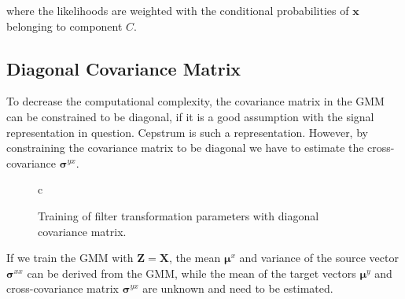 where the likelihoods are weighted with the conditional probabilities of $\mathbf{x}$ belonging to component $C$. 

\subsection{Diagonal Covariance Matrix} %
\label{sub:diagonal_covariance_matrix}
To decrease the computational complexity, the covariance matrix in the GMM can be constrained to be diagonal, if it is a good assumption with the signal representation in question. Cepstrum is such a representation. However, by constraining the covariance matrix to be diagonal we have to estimate the cross-covariance $\mathbf{\sigma}^{yx}$.

\begin{figure}[htbp]
	\centering
	\begin{tabular}[h]{c}
	\end{tabular}
	\caption{Training of filter transformation parameters with diagonal covariance matrix.}
	\label{fig:VC_training_diag}
\end{figure}

If we train the GMM with $\mathbf{Z}=\mathbf{X}$, the mean $\boldsymbol{\mu}^x$ and variance of the source vector $\boldsymbol{\sigma}^{xx}$ can be derived from the GMM, while the mean of the target vectors $\boldsymbol{\mu}^y$ and cross-covariance matrix $\mathbf{\sigma}^{yx}$ are unknown and need to be estimated. 

